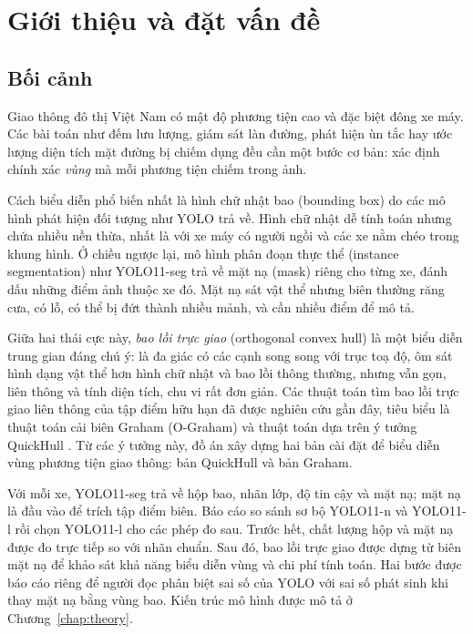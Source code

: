 \chapter{Giới thiệu và đặt vấn đề}
\label{chap:intro}

\section{Bối cảnh}

Giao thông đô thị Việt Nam có mật độ phương tiện cao và đặc biệt đông xe máy. Các bài toán như đếm lưu lượng,
giám sát làn đường, phát hiện ùn tắc hay ước lượng diện tích mặt đường bị chiếm dụng đều cần một bước cơ bản:
xác định chính xác \emph{vùng} mà mỗi phương tiện chiếm trong ảnh.

Cách biểu diễn phổ biến nhất là hình chữ nhật bao (bounding box) do các mô hình phát hiện đối tượng như YOLO
\cite{redmon2016yolo} trả về. Hình chữ nhật dễ tính toán nhưng chứa nhiều nền thừa, nhất là với xe máy có người
ngồi và các xe nằm chéo trong khung hình. Ở chiều ngược lại, mô hình phân đoạn thực thể (instance segmentation)
như YOLO11-seg \cite{yolo11} trả về mặt nạ (mask) riêng cho từng xe, đánh dấu những điểm ảnh thuộc xe đó. Mặt nạ sát vật thể nhưng biên thường răng cưa, có lỗ, có thể bị đứt thành nhiều mảnh,
và cần nhiều điểm để mô tả.

Giữa hai thái cực này, \emph{bao lồi trực giao} (orthogonal convex hull) là một biểu diễn trung gian đáng chú ý:
là đa giác có các cạnh song song với trục toạ độ, ôm sát hình dạng vật thể hơn hình chữ nhật và bao lồi thông thường,
nhưng vẫn gọn, liên thông và tính diện tích, chu vi rất đơn giản.
Các thuật toán tìm bao lồi trực giao liên thông của tập điểm hữu hạn đã được nghiên cứu gần đây,
tiêu biểu là thuật toán cải biên Graham (O-Graham) \cite{an2021ograham} và thuật toán dựa trên ý tưởng QuickHull
\cite{nguyen2022quickhull}.
Từ các ý tưởng này, đồ án xây dựng hai bản cài đặt để biểu diễn vùng phương tiện giao thông: bản QuickHull và bản Graham.

Với mỗi xe, YOLO11-seg trả về hộp bao, nhãn lớp, độ tin cậy và mặt nạ; mặt nạ là đầu vào để trích tập điểm biên.
Báo cáo so sánh sơ bộ YOLO11-n và YOLO11-l rồi chọn YOLO11-l cho các phép đo sau. Trước hết, chất lượng hộp và mặt nạ được đo
trực tiếp so với nhãn chuẩn. Sau đó, bao lồi trực giao được dựng từ biên mặt nạ để khảo sát khả năng biểu diễn vùng
và chi phí tính toán. Hai bước được báo cáo riêng để người đọc phân biệt sai số của YOLO với sai số phát sinh khi
thay mặt nạ bằng vùng bao. Kiến trúc mô hình được mô tả ở Chương~\ref{chap:theory}.

